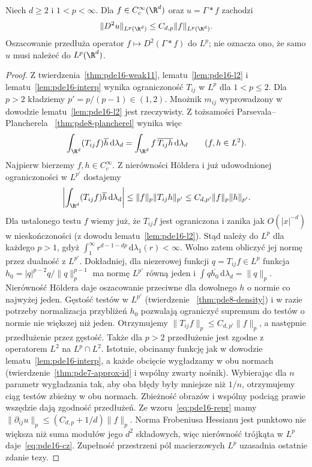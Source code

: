\begin{twierdzenie}
\label{thm:pde16-cz}
Niech $d\ge2$ i $1<p<\infty$. Dla
$f\in C_c^\infty(\R^d)$ oraz $u=\Gamma*f$ zachodzi
\begin{equation}\label{eq:pde16-cz}
 \|D^2u\|_{L^p(\R^d)}\le C_{d,p}\|f\|_{L^p(\R^d)}.
\end{equation}
Oszacowanie przedłuża operator $f\mapsto D^2(\Gamma*f)$
do $L^p$; nie oznacza ono, że samo $u$ musi należeć
do $L^p(\R^d)$.
\end{twierdzenie}
\begin{proof}
Z twierdzenia~\ref{thm:pde16-weak11},
lematu~\ref{lem:pde16-l2} i
lematu~\ref{lem:pde16-interp} wynika ograniczoność
$T_{ij}$ w $L^p$ dla $1<p\le2$.
Dla $p>2$ kładziemy $p'=p/(p-1)\in(1,2)$.
Mnożnik $m_{ij}$ wyprowadzony w dowodzie
lematu~\ref{lem:pde16-l2} jest rzeczywisty.
Z tożsamości Parsevala--Plancherela
~\ref{thm:pde8-plancherel} wynika więc
\[
 \int_{\R^d}(T_{ij}f)\overline h\,\mathrm d\lambda_d
 =\int_{\R^d}f\,\overline{T_{ij}h}\,\mathrm d\lambda_d
 \qquad(f,h\in L^2).
\]
Najpierw bierzemy $f,h\in C_c^\infty$.
Z nierówności Höldera i już udowodnionej ograniczoności
w $L^{p'}$ dostajemy
\[
 \left|\int_{\R^d}(T_{ij}f)\overline h\,\mathrm d\lambda_d\right|
 \le\|f\|_p\|T_{ij}h\|_{p'}
 \le C_{d,p'}\|f\|_p\|h\|_{p'}.
\]
Dla ustalonego testu $f$ wiemy już, że $T_{ij}f$ jest
ograniczona i zanika jak $O(|x|^{-d})$ w nieskończoności
(z dowodu lematu~\ref{lem:pde16-l2}).
Stąd należy do $L^p$ dla każdego $p>1$, gdyż
$\int_1^\infty r^{d-1-dp}\,\mathrm d\lambda_1(r)<\infty$.
Wolno zatem obliczyć jej normę przez dualność z $L^{p'}$.
Dokładniej, dla niezerowej funkcji $q=T_{ij}f\in L^p$
funkcja $h_0=|q|^{p-2}q/\|q\|_p^{p-1}$ ma normę
$L^{p'}$ równą jeden i
$\int q\overline{h_0}\,\mathrm d\lambda_d=\|q\|_p$.
Nierówność Höldera daje oszacowanie przeciwne dla
dowolnego $h$ o normie co najwyżej jeden.
Gęstość testów w $L^{p'}$ (twierdzenie
~\ref{thm:pde8-density}) i w razie potrzeby
normalizacja przybliżeń $h_0$ pozwalają ograniczyć
supremum do testów o normie nie większej niż jeden.
Otrzymujemy $\|T_{ij}f\|_p\le C_{d,p'}\|f\|_p$,
a następnie przedłużenie przez gęstość.
Także dla $p>2$ przedłużenie jest zgodne z operatorem
$L^2$ na $L^p\cap L^2$. Istotnie, obcinamy funkcję
jak w dowodzie lematu~\ref{lem:pde16-interp},
a każde obcięcie wygładzamy w obu normach
(twierdzenie~\ref{thm:pde7-approx-id} i wspólny
zwarty nośnik). Wybierając dla $n$ parametr wygładzania
tak, aby oba błędy były mniejsze niż $1/n$,
otrzymujemy ciąg testów zbieżny w obu normach.
Zbieżność obrazów i wspólny podciąg prawie wszędzie
dają zgodność przedłużeń.
Ze wzoru~\eqref{eq:pde16-repr} mamy
$\|\partial_{ij}u\|_p\le(C_{d,p}+1/d)\|f\|_p$.
Norma Frobeniusa Hessianu jest punktowo nie większa
niż suma modułów jego $d^2$ składowych, więc nierówność
trójkąta w $L^p$ daje~\eqref{eq:pde16-cz}.
Zupełność przestrzeni pól macierzowych $L^p$
uzasadnia ostatnie zdanie tezy.
\end{proof}

